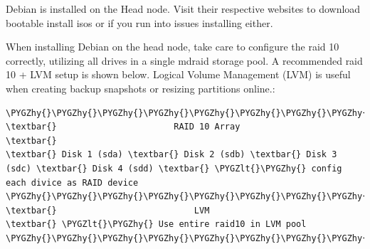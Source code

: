 \documentclass[letterpaper,10pt,english]{sphinxmanual}
\def\PYGZlt{\char`\<}
\def\PYGZhy{\char`\-}
\begin{document}
Debian is installed on the Head node. Visit their respective websites to download bootable install isos or if
you run into issues installing either.

When installing Debian on the head node,
take care to configure the raid 10 correctly, utilizing all drives in a single mdraid storage pool.
A recommended raid 10 + LVM setup is shown below.  Logical Volume Management (LVM) is useful
when creating backup snapshots or resizing partitions online.:

\begin{Verbatim}[commandchars=\\\{\}]
\PYGZhy{}\PYGZhy{}\PYGZhy{}\PYGZhy{}\PYGZhy{}\PYGZhy{}\PYGZhy{}\PYGZhy{}\PYGZhy{}\PYGZhy{}\PYGZhy{}\PYGZhy{}\PYGZhy{}\PYGZhy{}\PYGZhy{}\PYGZhy{}\PYGZhy{}\PYGZhy{}\PYGZhy{}\PYGZhy{}\PYGZhy{}\PYGZhy{}\PYGZhy{}\PYGZhy{}\PYGZhy{}\PYGZhy{}\PYGZhy{}\PYGZhy{}\PYGZhy{}\PYGZhy{}\PYGZhy{}\PYGZhy{}\PYGZhy{}\PYGZhy{}\PYGZhy{}\PYGZhy{}\PYGZhy{}\PYGZhy{}\PYGZhy{}\PYGZhy{}\PYGZhy{}\PYGZhy{}\PYGZhy{}\PYGZhy{}\PYGZhy{}\PYGZhy{}\PYGZhy{}\PYGZhy{}\PYGZhy{}\PYGZhy{}\PYGZhy{}\PYGZhy{}\PYGZhy{}\PYGZhy{}\PYGZhy{}\PYGZhy{}\PYGZhy{}\PYGZhy{}\PYGZhy{}\PYGZhy{}\PYGZhy{}
\textbar{}                       RAID 10 Array                       \textbar{}
\textbar{} Disk 1 (sda) \textbar{} Disk 2 (sdb) \textbar{} Disk 3 (sdc) \textbar{} Disk 4 (sdd) \textbar{} \PYGZlt{}\PYGZhy{} config each divice as RAID device
\PYGZhy{}\PYGZhy{}\PYGZhy{}\PYGZhy{}\PYGZhy{}\PYGZhy{}\PYGZhy{}\PYGZhy{}\PYGZhy{}\PYGZhy{}\PYGZhy{}\PYGZhy{}\PYGZhy{}\PYGZhy{}\PYGZhy{}\PYGZhy{}\PYGZhy{}\PYGZhy{}\PYGZhy{}\PYGZhy{}\PYGZhy{}\PYGZhy{}\PYGZhy{}\PYGZhy{}\PYGZhy{}\PYGZhy{}\PYGZhy{}\PYGZhy{}\PYGZhy{}\PYGZhy{}\PYGZhy{}\PYGZhy{}\PYGZhy{}\PYGZhy{}\PYGZhy{}\PYGZhy{}\PYGZhy{}\PYGZhy{}\PYGZhy{}\PYGZhy{}\PYGZhy{}\PYGZhy{}\PYGZhy{}\PYGZhy{}\PYGZhy{}\PYGZhy{}\PYGZhy{}\PYGZhy{}\PYGZhy{}\PYGZhy{}\PYGZhy{}\PYGZhy{}\PYGZhy{}\PYGZhy{}\PYGZhy{}\PYGZhy{}\PYGZhy{}\PYGZhy{}\PYGZhy{}\PYGZhy{}\PYGZhy{}
\textbar{}                           LVM                             \textbar{} \PYGZlt{}\PYGZhy{} Use entire raid10 in LVM pool
\PYGZhy{}\PYGZhy{}\PYGZhy{}\PYGZhy{}\PYGZhy{}\PYGZhy{}\PYGZhy{}\PYGZhy{}\PYGZhy{}\PYGZhy{}\PYGZhy{}\PYGZhy{}\PYGZhy{}\PYGZhy{}\PYGZhy{}\PYGZhy{}\PYGZhy{}\PYGZhy{}\PYGZhy{}\PYGZhy{}\PYGZhy{}\PYGZhy{}\PYGZhy{}\PYGZhy{}\PYGZhy{}\PYGZhy{}\PYGZhy{}\PYGZhy{}\PYGZhy{}\PYGZhy{}\PYGZhy{}\PYGZhy{}\PYGZhy{}\PYGZhy{}\PYGZhy{}\PYGZhy{}\PYGZhy{}\PYGZhy{}\PYGZhy{}\PYGZhy{}\PYGZhy{}\PYGZhy{}\PYGZhy{}\PYGZhy{}\PYGZhy{}\PYGZhy{}\PYGZhy{}\PYGZhy{}\PYGZhy{}\PYGZhy{}\PYGZhy{}\PYGZhy{}\PYGZhy{}\PYGZhy{}\PYGZhy{}\PYGZhy{}\PYGZhy{}\PYGZhy{}\PYGZhy{}\PYGZhy{}\PYGZhy{}

\end{Verbatim}
\end{document}
